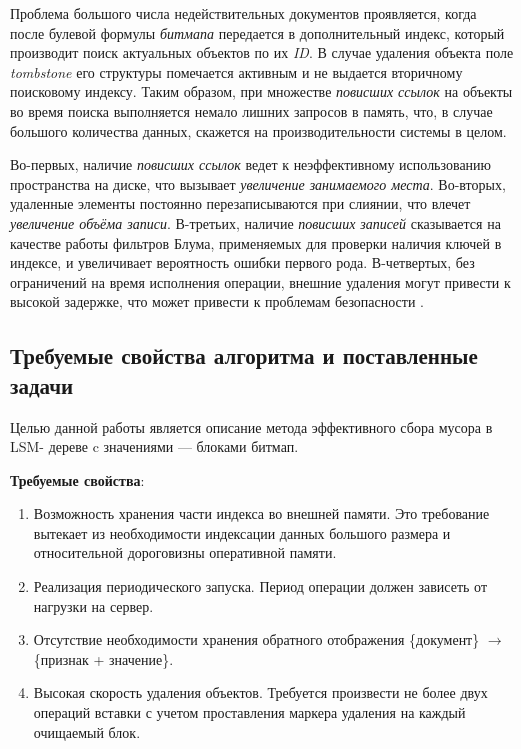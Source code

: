 Проблема большого числа недействительных документов проявляется, когда после
булевой формулы \textit{битмапа} передается в дополнительный индекс, который производит
поиск актуальных объектов по их \textit{ID}. В случае удаления объекта поле
\textit{tombstone} его структуры помечается активным и не выдается вторичному
поисковому индексу. Таким образом, при множестве \textit{повисших ссылок} на
объекты во время поиска выполняется немало лишних запросов в память, что, в
случае большого количества данных, скажется на производительности системы в целом.

Во-первых, наличие \textit{повисших ссылок} ведет к неэффективному использованию
пространства на диске, что вызывает \textit{увеличение занимаемого места}. Во-вторых,
удаленные элементы постоянно перезаписываются при слиянии, что влечет
\textit{увеличение объёма записи}. В-третьих, наличие \textit{повисших записей} сказывается
на качестве работы фильтров Блума, применяемых для проверки наличия ключей в
индексе, и увеличивает вероятность ошибки первого рода. В-четвертых, без
ограничений на время исполнения операции, внешние удаления могут привести к высокой задержке,
что может привести к проблемам безопасности \cite{Lethe:2020}.
\label{amplification}

\subsection{Требуемые свойства алгоритма и поставленные задачи}

Целью данной работы является описание метода эффективного сбора мусора в LSM-
дереве c значениями — блоками битмап.

\textbf{Требуемые свойства}:
\begin{enumerate}
    \item Возможность хранения части индекса во внешней памяти. Это требование вытекает
    из необходимости индексации данных большого размера и относительной дороговизны
    оперативной памяти.
    \item Реализация периодического запуска. Период операции должен зависеть от нагрузки 
    на сервер.
    \item Отсутствие необходимости хранения обратного отображения \{документ\} $\rightarrow$
    \{признак + значение\}.
    \item Высокая скорость удаления объектов. Требуется произвести не более двух операций
    вставки с учетом проставления маркера удаления на каждый очищаемый блок.
\end{enumerate}

